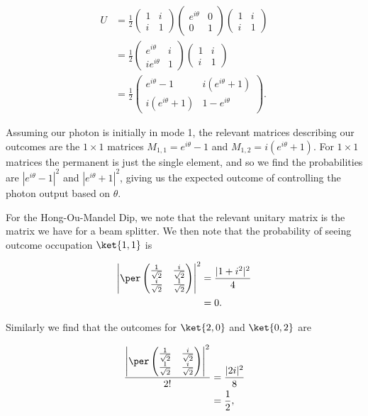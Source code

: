 \begin{align}
U &= \frac{1}{2}\begin{pmatrix}1&i\\i&1\end{pmatrix}\begin{pmatrix}e^{i\theta}&0\\0&1\end{pmatrix}\begin{pmatrix}1&i\\i&1\end{pmatrix}\\
&= \frac{1}{2}\begin{pmatrix}e^{i\theta}&i\\ie^{i\theta}&1\end{pmatrix}\begin{pmatrix}1&i\\i&1\end{pmatrix}\\
&= \frac{1}{2}\begin{pmatrix}e^{i\theta}-1&i(e^{i\theta}+1)\\i(e^{i\theta}+1)&1-e^{i\theta}\end{pmatrix}.
\end{align}

Assuming our photon is initially in mode 1, the relevant matrices describing our outcomes are the $1\times 1$ matrices $M_{1,1} = e^{i\theta}-1$ and $M_{1,2} = i(e^{i\theta}+1)$. For $1\times 1$ matrices the permanent is just the single element, and so we find the probabilities are $|e^{i\theta}-1|^2$ and $|e^{i\theta}+1|^2$, giving us the expected outcome of controlling the photon output based on $\theta$.

For the Hong-Ou-Mandel Dip, we note that the relevant unitary matrix is the matrix we have for a beam splitter. We then note that the probability of seeing outcome occupation $\ket{1,1}$ is

\begin{align}
\left|\per\begin{pmatrix}\frac{1}{\sqrt{2}}&\frac{i}{\sqrt{2}}\\\frac{i}{\sqrt{2}}&\frac{1}{\sqrt{2}}\end{pmatrix}\right|^2 &= \frac{|1+i^2|^2}{4}\\
&= 0.
\end{align}

Similarly we find that the outcomes for $\ket{2,0}$ and $\ket{0,2}$ are

\begin{align}
\frac{\left|\per\begin{pmatrix}\frac{1}{\sqrt{2}}&\frac{i}{\sqrt{2}}\\\frac{1}{\sqrt{2}}&\frac{i}{\sqrt{2}}\end{pmatrix}\right|^2}{2!} &= \frac{|2i|^2}{8}\\
&= \frac{1}{2},
\end{align}

